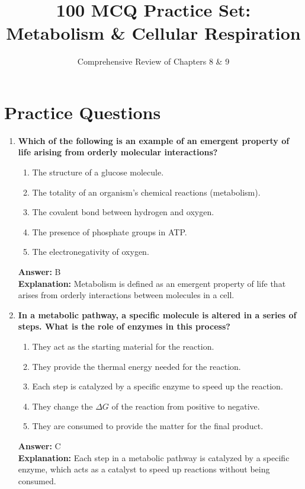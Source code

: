 \documentclass[11pt, a4paper]{article}
\title{100 MCQ Practice Set: Metabolism \& Cellular Respiration}
\author{Comprehensive Review of Chapters 8 \& 9}
\date{}
\begin{document}
\maketitle

\section*{Practice Questions}

\begin{enumerate}[leftmargin=*, label=\arabic*.]


\item \textbf{Which of the following is an example of an emergent property of life arising from orderly molecular interactions?}
\begin{enumerate}[label=\Alph*.]
    \item The structure of a glucose molecule.
    \item The totality of an organism's chemical reactions (metabolism).
    \item The covalent bond between hydrogen and oxygen.
    \item The presence of phosphate groups in ATP.
    \item The electronegativity of oxygen.
\end{enumerate}
\textbf{Answer:} B \\
\textbf{Explanation:} Metabolism is defined as an emergent property of life that arises from orderly interactions between molecules in a cell.

\item \textbf{In a metabolic pathway, a specific molecule is altered in a series of steps. What is the role of enzymes in this process?}
\begin{enumerate}[label=\Alph*.]
    \item They act as the starting material for the reaction.
    \item They provide the thermal energy needed for the reaction.
    \item Each step is catalyzed by a specific enzyme to speed up the reaction.
    \item They change the $\Delta G$ of the reaction from positive to negative.
    \item They are consumed to provide the matter for the final product.
\end{enumerate}
\textbf{Answer:} C \\
\textbf{Explanation:} Each step in a metabolic pathway is catalyzed by a specific enzyme, which acts as a catalyst to speed up reactions without being consumed.


\end{enumerate}
\end{document}
